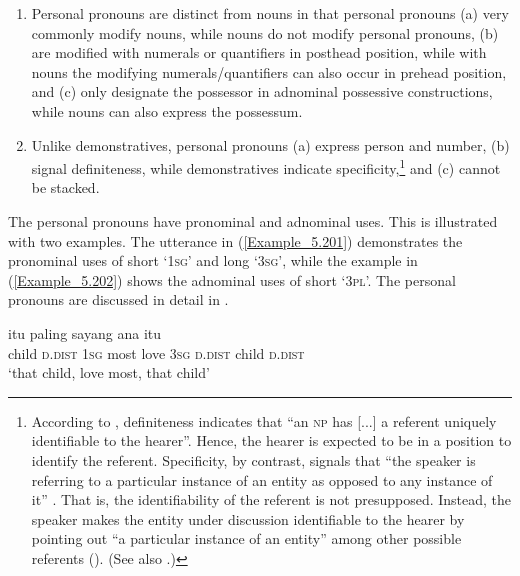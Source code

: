 \begin{enumerate}
\item 
Personal pronouns are distinct from nouns in that personal pronouns (a) very commonly modify nouns, while nouns do not modify personal pronouns, (b) are modified with numerals or quantifiers in posthead position, while with nouns the modifying numerals/quantifiers can also occur in prehead position, and (c) only designate the possessor in adnominal possessive constructions, while nouns can also express the possessum.

\item 
Unlike demonstratives, personal pronouns (a) express person and number, (b) signal definiteness, while demonstratives indicate specificity,\footnote{\label{Footnote_5.17}According to \citet[148]{Andrews.2007}, definiteness indicates that “an \textsc{np} has [...] a referent uniquely identifiable to the hearer”. Hence, the hearer is expected to be in a position to identify the referent. Specificity, by contrast, signals that “the speaker is referring to a particular instance of an entity as opposed to any instance of it” \citep[148]{Andrews.2007}. That is, the identifiability of the referent is not presupposed. Instead, the speaker makes the entity under discussion identifiable to the hearer by pointing out “a particular instance of an entity” among other possible referents (\citeyear*[148]{Andrews.2007}). (See also \citealt{Abbot.2006}.)\label{Footnote_5.164}} and (c) cannot be stacked.

\end{enumerate}

The personal pronouns have pronominal and adnominal uses. This is illustrated with two examples. The utterance in (\ref{Example_5.201}) demonstrates the pronominal uses of short  ‘\textsc{1sg}’ and long  ‘\textsc{3sg}’, while the example in (\ref{Example_5.202}) shows the adnominal uses of short  ‘\textsc{3pl}’. The personal pronouns are discussed in detail in .


\ea
\label{Example_5.201}
 {itu} {} {paling} {sayang} {} {} {ana} {itu}\\ %
 child  \textsc{d.dist}  \textsc{1sg}  most  love  \textsc{3sg}  \textsc{d.dist}  child  \textsc{d.dist}\\
\glt 
‘that child,  love \bluebold{)} most, that child’ \textstyleExampleSource{[081011-023-Cv.0097]}
\z

